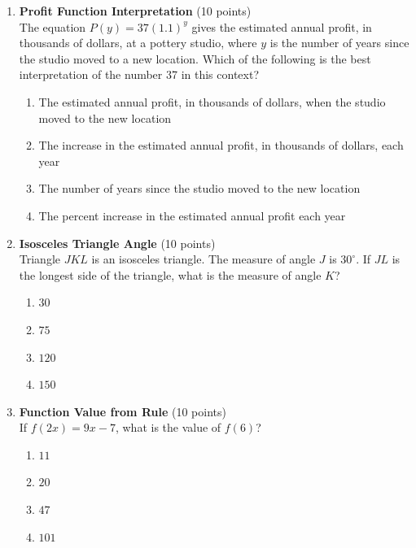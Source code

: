 \begin{enumerate}
  \item \textbf{Profit Function Interpretation} (10 points)\\
  The equation $P(y)=37(1.1)^y$ gives the estimated annual profit, in thousands of dollars, at a pottery studio, where $y$ is the number of years since the studio moved to a new location. Which of the following is the best interpretation of the number 37 in this context?
  \begin{enumerate}[label=\Alph*.]
    \item The estimated annual profit, in thousands of dollars, when the studio moved to the new location
    \item The increase in the estimated annual profit, in thousands of dollars, each year
    \item The number of years since the studio moved to the new location
    \item The percent increase in the estimated annual profit each year
  \end{enumerate}
  \begin{subanswer}
  \end{subanswer}

  \item \textbf{Isosceles Triangle Angle} (10 points)\\
  Triangle $JKL$ is an isosceles triangle. The measure of angle $J$ is $30^\circ$. If $JL$ is the longest side of the triangle, what is the measure of angle $K$?
  \begin{enumerate}[label=\Alph*.]
    \item $30$
    \item $75$
    \item $120$
    \item $150$
  \end{enumerate}
  \begin{subanswer}
  \end{subanswer}

  \item \textbf{Function Value from Rule} (10 points)\\
  If $f(2x)=9x-7$, what is the value of $f(6)$?
  \begin{enumerate}[label=\Alph*.]
    \item $11$
    \item $20$
    \item $47$
    \item $101$
  \end{enumerate}
  \begin{subanswer}
  \end{subanswer}


\end{enumerate}
